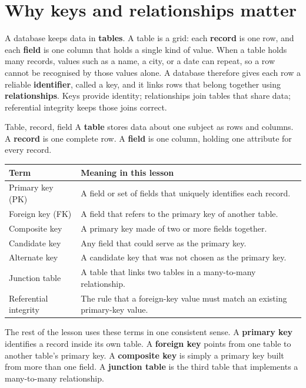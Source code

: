 \section{Why keys and relationships matter}
A database keeps data in \textbf{tables}. A table is a grid: each
\textbf{record} is one row, and each \textbf{field} is one column that holds a
single kind of value. When a table holds many records, values such as a name,
a city, or a date can repeat, so a row cannot be recognised by those values
alone. A database therefore gives each row a reliable \textbf{identifier},
called a key, and it links rows that belong together using
\textbf{relationships}. Keys provide identity; relationships join tables that
share data; referential integrity keeps those joins correct.

\begin{definitionbox}{Table, record, field}
A \textbf{table} stores data about one subject as rows and columns. A
\textbf{record} is one complete row. A \textbf{field} is one column, holding
one attribute for every record.
\end{definitionbox}

\begin{center}
\begin{tabular}{p{}p{}}
\toprule
\textbf{Term} & \textbf{Meaning in this lesson} \\
\midrule
Primary key (PK) & A field or set of fields that uniquely identifies each record. \\
Foreign key (FK) & A field that refers to the primary key of another table. \\
Composite key & A primary key made of two or more fields together. \\
Candidate key & Any field that could serve as the primary key. \\
Alternate key & A candidate key that was not chosen as the primary key. \\
Junction table & A table that links two tables in a many-to-many relationship. \\
Referential integrity & The rule that a foreign-key value must match an existing primary-key value. \\
\bottomrule
\end{tabular}
\end{center}

The rest of the lesson uses these terms in one consistent sense. A
\textbf{primary key} identifies a record inside its own table. A
\textbf{foreign key} points from one table to another table's primary key. A
\textbf{composite key} is simply a primary key built from more than one field.
A \textbf{junction table} is the third table that implements a many-to-many
relationship.

